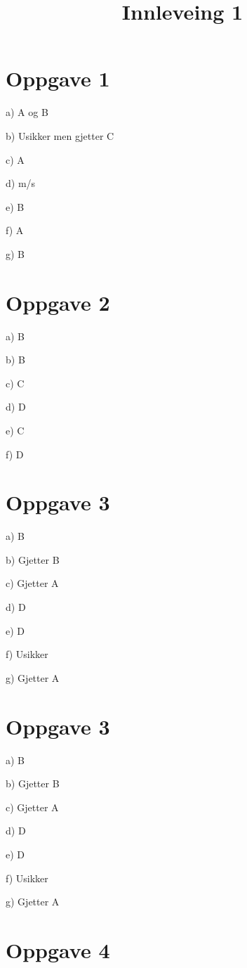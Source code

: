 \documentclass{article}
\title{Innleveing 1}
\begin{document}
\maketitle

\section{Oppgave 1}

a) A og B

b) Usikker men gjetter C 

c) A

d) m/s

e) B

f) A

g) B

\section{Oppgave 2}

a) B

b) B

c) C

d) D

e) C

f) D

\section{Oppgave 3}

a) B

b) Gjetter B

c) Gjetter A

d) D

e) D

f) Usikker

g) Gjetter A

\section{Oppgave 3}

a) B

b) Gjetter B

c) Gjetter A

d) D

e) D

f) Usikker

g) Gjetter A

\section{Oppgave 4}
\end{document}
